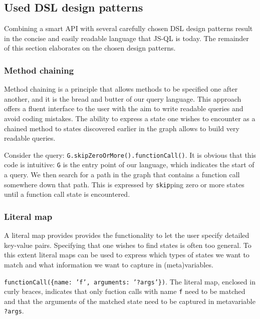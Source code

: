 \subsection*{Used DSL design patterns}

Combining a smart API with several carefully chosen DSL design patterns\cite{DSLFowler} result in the concise and easily readable language that JS-QL is today. The remainder of this section elaborates on the chosen design patterns.

\subsubsection*{Method chaining}

Method chaining is a principle that allows methods to be specified one after another, and it is the bread and butter of our query language. This approach offers a fluent interface to the user with the aim to write readable queries and avoid coding mistakes. The ability to express a state one wishes to encounter as a chained method to states discovered earlier in the graph allows to build very readable queries.
\begin{exmp}
\label{ex:fluentInterface}
 Consider the query: \texttt{G.skipZeroOrMore().functionCall()}. It is obvious that this code is intuitive: \texttt{G} is the entry point of our language, which indicates the start of a query. We then search for a path in the graph that contains a function call somewhere down that path. This is expressed by \texttt{skip}ping zero or more states until a function call state is encountered.
\end{exmp}

\subsubsection*{Literal map}
A literal map provides provides the functionality to let the user specify detailed key-value pairs.
Specifying that one wishes to find states is often too general. To this extent literal maps can be used to express which types of states we want to match and what information we want to capture in (meta)variables. 
\begin{exmp}
\label{ex:literalMap}
\texttt{functionCall(\{name: 'f', arguments: '?args'\})}. The literal map, enclosed in curly braces, indicates that only fuction calls with name \texttt{f} need to be matched and that the arguments of the matched state need to be captured in metavariable \texttt{?args}.
\end{exmp}

